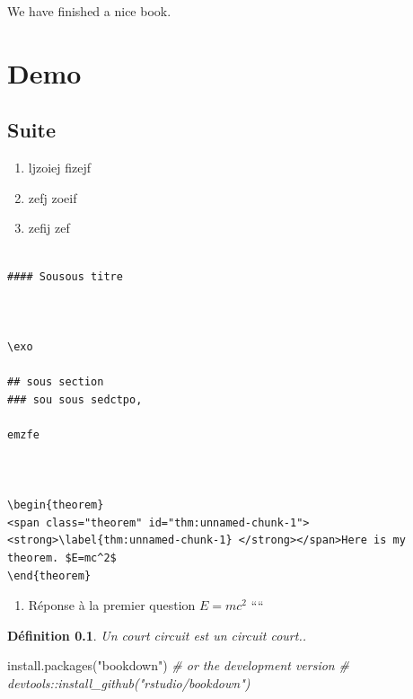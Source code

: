 \documentclass[
]{book}
\newenvironment{Shaded}{\begin{snugshade}}{\end{snugshade}}
\newcommand{\CommentTok}[1]{\textcolor[rgb]{0.56,0.35,0.01}{\textit{#1}}}
\newcommand{\FunctionTok}[1]{\textcolor[rgb]{0.00,0.00,0.00}{#1}}
\newcommand{\NormalTok}[1]{#1}
\newcommand{\StringTok}[1]{\textcolor[rgb]{0.31,0.60,0.02}{#1}}
\providecommand{\tightlist}{%
  \setlength{\itemsep}{0pt}\setlength{\parskip}{0pt}}
\newtheorem{definition}{Définition}
\newtheorem{theorem}{Application}
\def\tightlist{}
\newcounter{numeroexo}
\newcommand{\exo}{\par\noindent\stepcounter{numeroexo}
	\hspace{-.25cm}\fbox{\textbf{Exercice \arabic{numeroexo}}}\quad}
\begin{document}
We have finished a nice book.

\hypertarget{demo}{%
\chapter*{Demo}\label{demo}}

\hypertarget{suite}{%
\section{Suite}\label{suite}}

\begin{enumerate}
\def\labelenumi{\arabic{enumi}.}
\tightlist
\item
  ljzoiej fizejf
\item
  zefj zoeif
\item
  zefij zef
\end{enumerate}

\begin{verbatim}

#### Sousous titre



\exo 

## sous section
### sou sous sedctpo,

emzfe



\begin{theorem}
<span class="theorem" id="thm:unnamed-chunk-1"><strong>\label{thm:unnamed-chunk-1} </strong></span>Here is my theorem. $E=mc^2$
\end{theorem}
\end{verbatim}

\begin{enumerate}
\def\labelenumi{\arabic{enumi}.}
\tightlist
\item
  Réponse à la premier question \(E=mc^2\)
  ````
\end{enumerate}

\begin{definition}
\protect\hypertarget{def:unnamed-chunk-2}{}{\label{def:unnamed-chunk-2} }Un court circuit est un circuit court..
\end{definition}

\begin{Shaded}
\begin{Highlighting}[]
\FunctionTok{install.packages}\NormalTok{(}\StringTok{"bookdown"}\NormalTok{)}
\CommentTok{\# or the development version}
\CommentTok{\# devtools::install\_github("rstudio/bookdown")}
\end{Highlighting}
\end{Shaded}
\end{document}
